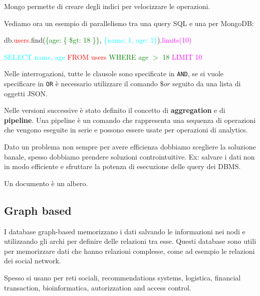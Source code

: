 Mongo permette di creare degli indici per velocizzare le operazioni.
\begin{esempio}
      Vediamo ora un esempio di parallelismo tra una query SQL e una per
      MongoDB:
      \begin{center}
            db.\textcolor{red}{users}.find(\textcolor{green}{\{age: \{ \$gt: 18 \}\}},
            \textcolor{cyan}{\{name: 1, age: 1\}}).\textcolor{magenta}{limits(10)}
      \end{center}
      \begin{center}
            \textcolor{cyan}{SELECT name, age} \textcolor{red}{FROM users}
            \textcolor{green}{WHERE age $>$ 18} \textcolor{magenta}{LIMIT 10}
      \end{center}
\end{esempio}
Nelle interrogazioni, tutte le clausole sono specificate in \texttt{AND}, se si
vuole specificare in \texttt{OR} è necessario utilizzare il comando $\$or$ seguito
da una lista di oggetti JSON.

Nelle versioni successive è stato definito il concetto di \textbf{aggregation} e
di \textbf{pipeline}. Una pipeline è un comando che rappresenta una sequenza di
operazioni che vengono eseguite in serie e possono essere usate per operazioni
di analytics.

\begin{nota}
      Dato un problema non sempre per avere efficienza dobbiamo scegliere la
      soluzione banale, spesso dobbiamo prendere soluzioni controintuitive. Ex:
      salvare i dati non in modo efficiente e sfruttare la potenza di esecuzione
      delle query dei DBMS.
\end{nota}
\begin{nota}
      Un documento è un albero.
\end{nota}
\subsection{Graph based}
I database graph-based memorizzano i dati salvando le informazioni nei nodi e
utilizzando gli archi per definire delle relazioni tra esse. Questi database sono
utili per memorizzare dati che hanno relazioni complesse, come ad esempio le
relazioni dei social network.

Spesso si usano per reti sociali, recommendations systems, logistica, financial
transaction, bioinformatica, autorizzation and access control.

